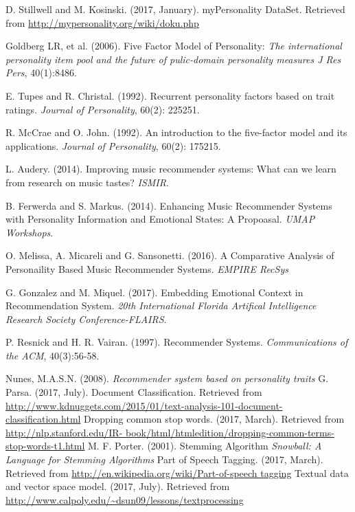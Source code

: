 
\newpage
{}
{}
\begin{thebibliography}{9}
		D. Stillwell and M. Kosinski. (2017, January). myPersonality DataSet. Retrieved from \url{ http://mypersonality.org/wiki/doku.php}

	 Goldberg LR, et al. (2006). Five Factor Model of Personality:  \textit{The international personality item pool and the future of pulic-domain personality measures J Res Pers}, 40(1):8486.

 E. Tupes and R. Christal. (1992). Recurrent personality factors based on trait ratings. \textit{Journal of Personality}, 60(2): 225251.

 R. McCrae and O. John. (1992). An introduction to the five-factor model and its applications. \textit{Journal of Personality}, 60(2): 175215.

 L. Audery. (2014). Improving music recommender systems: What can we learn from research on music tastes? \textit{ISMIR}.

 B. Ferwerda and S. Markus. (2014). Enhancing Music Recommender Systems with Personality Information and Emotional States: A Propoasal. \textit{UMAP Workshops}.

	 O. Melissa, A. Micareli and G. Sansonetti. (2016). A Comparative Analysis of Personaility Based Music Recommender Systems. \textit{EMPIRE RecSys}

 G. Gonzalez and M. Miquel. (2017). Embedding Emotional Context in Recommendation System. \textit{20th International Florida Artifical Intelligence Research Society Conference-FLAIRS}.

 P. Resnick and H. R. Vairan. (1997). Recommender Systems. \textit{Communications of the ACM}, 40(3):56-58.

Nunes, M.A.S.N. (2008). \textit{Recommender system based on personality traits}
	G. Parsa. (2017, July). Document Classification. Retrieved from \url{http://www.kdnuggets.com/2015/01/text-analysis-101-document-classification.html}
	Dropping common stop words. (2017, March). Retrieved from \url{http://nlp.stanford.edu/IR- book/html/htmledition/dropping-common-terms-stop-words-t1.html}
	M. F. Porter. (2001). Stemming Algorithm \textit{Snowball: A Language for Stemming Algorithms}
 Part of Speech Tagging. (2017, March). Retrieved from \url{http://en.wikipedia.org/wiki/Part-of-speech tagging}
Textual data and vector space model. (2017, July). Retrieved from \url{http://www.calpoly.edu/~dsun09/lessons/textprocessing}


\end{thebibliography}
